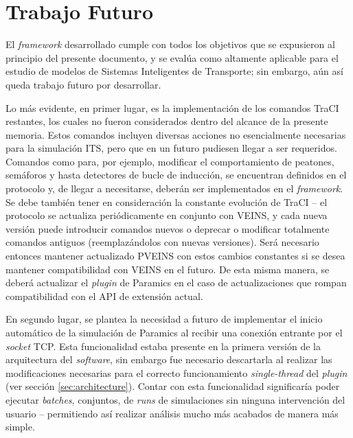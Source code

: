 \section{Trabajo Futuro}

El \emph{framework} desarrollado cumple con todos los objetivos que se expusieron al principio del presente documento, y se evalúa como altamente aplicable para el estudio de modelos de Sistemas Inteligentes de Transporte; sin embargo, aún así queda trabajo futuro por desarrollar. 

Lo más evidente, en primer lugar, es la implementación de los comandos TraCI restantes, los cuales no fueron considerados dentro del alcance de la presente memoria. Estos comandos incluyen diversas acciones no esencialmente necesarias para la simulación ITS, pero que en un futuro pudiesen llegar a ser requeridos. Comandos como para, por ejemplo, modificar el comportamiento de peatones, semáforos y hasta detectores de bucle de inducción, se encuentran definidos en el protocolo y, de llegar a necesitarse, deberán ser implementados en el \emph{framework}. 
Se debe también tener en consideración la constante evolución de TraCI -- el protocolo se actualiza periódicamente en conjunto con VEINS, y cada nueva versión puede introducir comandos nuevos o deprecar o modificar totalmente comandos antiguos (reemplazándolos con nuevas versiones). Será necesario entonces mantener actualizado PVEINS con estos cambios constantes si se desea mantener compatibilidad con VEINS en el futuro. 
De esta misma manera, se deberá actualizar el \emph{plugin} de Paramics en el caso de actualizaciones que rompan compatibilidad con el API de extensión actual.

En segundo lugar, se plantea la necesidad a futuro de implementar el inicio automático de la simulación de Paramics al recibir una conexión entrante por el \emph{socket} TCP. Esta funcionalidad estaba presente en la primera versión de la arquitectura del \emph{software}, sin embargo fue necesario descartarla al realizar las modificaciones necesarias para el correcto funcionamiento \emph{single-thread} del \emph{plugin} (ver sección \ref{sec:architecture}). Contar con esta funcionalidad significaría poder ejecutar \emph{batches}, conjuntos, de \emph{runs} de simulaciones sin ninguna intervención del usuario -- permitiendo así realizar análisis mucho más acabados de manera más simple.

